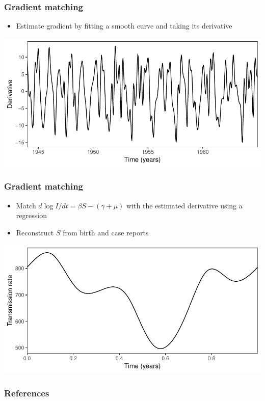 \documentclass{beamer}
\begin{document}
\begin{frame}
\frametitle{Gradient matching}
\begin{itemize}
	\item Estimate gradient by fitting a smooth curve and taking its derivative
\end{itemize}
\begin{center}
\includegraphics[width=\textwidth]{grad2.pdf}
\end{center}
\end{frame}

\begin{frame}
\frametitle{Gradient matching}
\begin{itemize}
	\item Match $d \log I/dt = \beta S - (\gamma + \mu)$ with the estimated derivative using a regression
	\item Reconstruct $S$ from birth and case reports
\end{itemize}
\begin{center}
\includegraphics[width=\textwidth]{grad3.pdf}
\end{center}
\end{frame}







\begin{frame}
\frametitle{References}
\tiny
% 
\end{frame}
\end{document}

